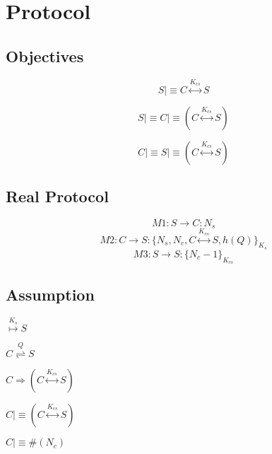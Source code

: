 \chapter{Protocol}

\section{Objectives}
\begin{equation}
	S \mid\equiv C \stackrel{ K_{cs} }\longleftrightarrow S
\end{equation}

\begin{equation}
	S \mid\equiv C \mid\equiv (C \stackrel{ K_{cs} }\longleftrightarrow S)
\end{equation}

\begin{equation}
	C \mid\equiv S \mid\equiv (C \stackrel{ K_{cs} }\longleftrightarrow S)
\end{equation}

\section{Real Protocol}
\begin{equation}
M1:  S \rightarrow C:  N_{s}
\end{equation}
\begin{equation}
M2:  C \rightarrow S: \{ N_{s}, N_{c}, C \stackrel{ K_{cs} }\longleftrightarrow S, h( Q ) \}_{K_{s}}
\end{equation}
\begin{equation}
M3:  S \rightarrow S: \{ N_{c} - 1 \}_{K_{cs}}
\end{equation}

\section{Assumption}

\noindent
$
\stackrel{ K_{s} }\mapsto S
$

\noindent
$
C \stackrel{ Q }\rightleftharpoons S
$

\noindent
$
C \Rightarrow ( C \stackrel{ K_{cs} }\longleftrightarrow S )
$

\noindent
$
C \mid\equiv ( C \stackrel{ K_{cs} }\longleftrightarrow S )
$

\noindent
$
C \mid\equiv \#( N_{c} )
$

